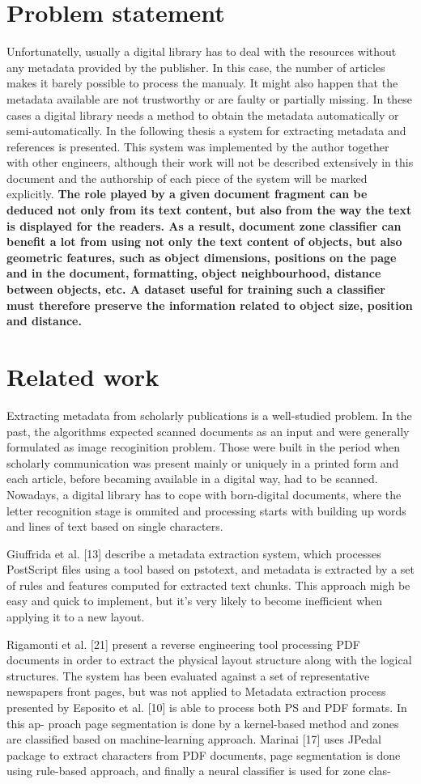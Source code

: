 \section{Problem statement}
Unfortunatelly, usually a digital library has to deal with the resources without any metadata provided by the publisher. In this case, the number of articles makes it barely possible to process the manualy. It might also happen that the metadata available are not trustworthy or are faulty or partially missing. In these cases a digital library needs a method to obtain the metadata automatically or semi-automatically. In the following thesis a system for extracting metadata and references is presented. This system was implemented by the author together with other engineers, although their work will not be described extensively in this document and the authorship of each piece of the system will be marked explicitly. 
\textbf{The role played by a given document fragment can be deduced not only from its text content, but also from the way the text is displayed for the readers. As a result, document zone classifier can benefit a lot from using not only the text content of objects, but also geometric features, such as object dimensions, positions on the page and in the document, formatting, object neighbourhood, distance between objects, etc. A dataset useful for training such a classifier must therefore preserve the information related to object size, position and distance.}
\section{Related work}
Extracting metadata from scholarly publications is a well-studied problem. In the past, the algorithms expected scanned documents as an input and were generally formulated as image recoginition problem. Those were built in the period when scholarly communication was present mainly or uniquely in a printed form and each article, before becaming available in a digital way, had to be scanned.
Nowadays, a digital library has to cope with born-digital documents, where the letter recognition stage is ommited and processing starts with building up words and lines of text based on single characters.


Giuffrida et al. [13] describe a metadata extraction system, which processes PostScript files using a tool
based on pstotext, and metadata is extracted by a set of rules and features computed for extracted text chunks. This approach migh be easy and quick to implement, but it's very likely to become inefficient when applying it to a new layout.

Rigamonti et al. [21] present a reverse engineering tool processing PDF documents in order to extract the physical layout structure along with the logical structures. The system has been evaluated against a set of representative newspapers front pages, but was not applied to 
Metadata extraction process presented by Esposito et al. [10]
is able to process both PS and PDF formats. In this ap-
proach page segmentation is done by a kernel-based method
and zones are classified based on machine-learning approach.
Marinai [17] uses JPedal package to extract characters from
PDF documents, page segmentation is done using rule-based
approach, and finally a neural classifier is used for zone clas-